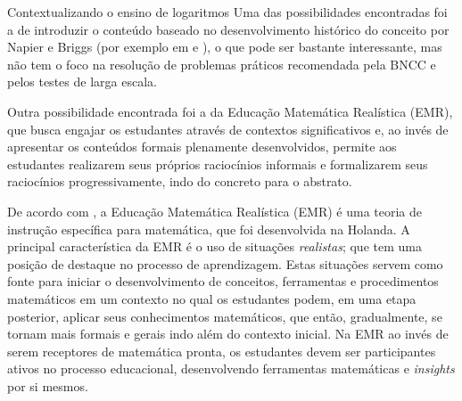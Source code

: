 \begin{apresentacao}{Contextualizando o ensino de logaritmos}
Uma das possibilidades encontradas foi a de introduzir o conteúdo baseado no desenvolvimento histórico do conceito por Napier e Briggs (por exemplo em \cite{Pedrosa2018} e \cite{Panagiotou2011}), o que pode ser bastante interessante, mas não tem o foco na resolução de problemas práticos recomendada pela BNCC e pelos testes de larga escala.

Outra possibilidade encontrada foi a da Educação Matemática Realística (EMR), que busca engajar os estudantes através de contextos significativos e, ao invés de apresentar os conteúdos formais plenamente desenvolvidos, permite aos estudantes realizarem seus próprios raciocínios informais e formalizarem seus raciocínios progressivamente, indo do concreto para o abstrato.

De acordo com  \cite{HeuvelPanhuizen}, a Educação Matemática Realística (EMR) é uma teoria de instrução específica para matemática, que foi desenvolvida na Holanda. A principal característica da EMR é o uso de situações \textit{realistas}; que tem uma posição de destaque no processo de aprendizagem. Estas situações servem como fonte para iniciar o desenvolvimento de conceitos, ferramentas e procedimentos matemáticos em um contexto no qual os estudantes podem, em uma etapa posterior, aplicar seus conhecimentos matemáticos, que então, gradualmente, se tornam mais formais e gerais indo além do contexto inicial. Na EMR ao invés de serem receptores de matemática pronta, os estudantes devem ser participantes ativos no processo educacional, desenvolvendo ferramentas matemáticas e \textit{insights} por si mesmos.


\end{apresentacao}
